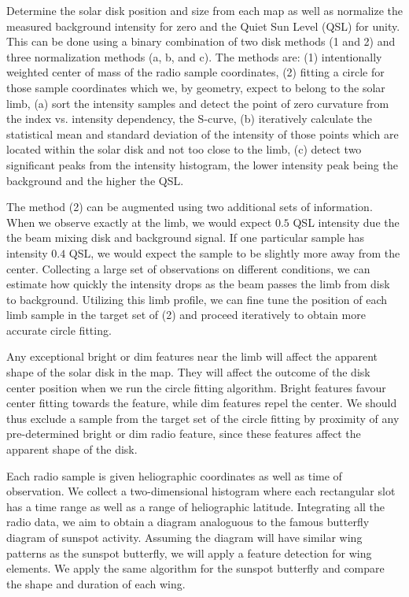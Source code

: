\documentclass{aa}
\begin{document}
   {Determine the solar disk position and size from each map as well as normalize the measured background intensity for 
   zero and the Quiet Sun Level (QSL) for unity. This can be done using a binary combination of two disk methods (1 and 
   2) and three normalization methods (a, b, and c). The methods are: (1) intentionally weighted center of mass of the 
   radio sample coordinates, (2) fitting a circle for those sample coordinates which we, by geometry, expect to belong 
   to the solar limb, (a) sort the intensity samples and detect the point of zero curvature from the index vs. intensity 
   dependency, the S-curve, (b) iteratively calculate the statistical mean and standard deviation of the intensity of 
   those points which are located within the solar disk and not too close to the limb, (c) detect two significant peaks 
   from the intensity histogram, the lower intensity peak being the background and the higher the QSL.

   The method (2) can be augmented using two additional sets of information. When we observe exactly at the limb, we 
   would expect $0.5$ QSL intensity due the the beam mixing disk and background signal. If one particular sample has 
   intensity $0.4$ QSL, we would expect the sample to be slightly more away from the center. Collecting a large set of 
   observations on different conditions, we can estimate how quickly the intensity drops as the beam passes the limb 
   from disk to background. Utilizing this limb profile, we can fine tune the position of each limb sample in the target 
   set of (2) and proceed iteratively to obtain more accurate circle fitting.

   Any exceptional bright or dim features near the limb will affect the apparent shape of the solar disk in the map. 
   They will affect the outcome of the disk center position when we run the circle fitting algorithm. Bright features 
   favour center fitting towards the feature, while dim features repel the center. We should thus exclude a sample from 
   the target set of the circle fitting by proximity of any pre-determined bright or dim radio feature, since these 
   features affect the apparent shape of the disk.
   
   Each radio sample is given heliographic coordinates as well as time of observation. We collect a two-dimensional 
   histogram where each rectangular slot has a time range as well as a range of heliographic latitude. Integrating all 
   the radio data, we aim to obtain a diagram analoguous to the famous butterfly diagram of sunspot activity. Assuming 
   the diagram will have similar wing patterns as the sunspot butterfly, we will apply a feature detection for wing 
   elements. We apply the same algorithm for the sunspot butterfly and compare the shape and duration of each wing.}
\end{document}
